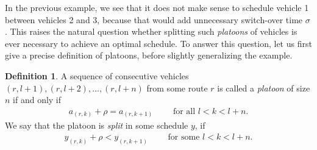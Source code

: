 \documentclass[a4paper]{report}
\theoremstyle{definition}
\newtheorem{define}{Definition}[chapter]
\theoremstyle{plain}
\begin{document}
In the previous example, we see that it does not make sense to schedule vehicle
1 between vehicles 2 and 3, because that would add unnecessary switch-over time
$\sigma$. This raises the natural question whether splitting such
\textit{platoons} of vehicles is ever necessary to achieve an optimal schedule.
To answer this question, let us first give a precise definition of platoons,
before slightly generalizing the example.
%
\begin{define}
  A sequence of consecutive vehicles $(r, l+1), (r, l+2), \dots, (r, l+n)$ from
  some route $r$ is called a \textit{platoon} of size $n$ if and only if
  \begin{align}
  a_{(r,k)} + \rho = a_{(r, k+1)}  \quad \quad \text{ for all } l < k < l + n.
  \end{align}
 We say that the platoon is \textit{split}
  in some schedule $y$, if
  \begin{align}
  y_{(r, k)} + \rho < y_{(r, k + 1)} \quad \quad \text{ for some } l < k < l + n.
  \end{align}
\end{define}
%
\end{document}
